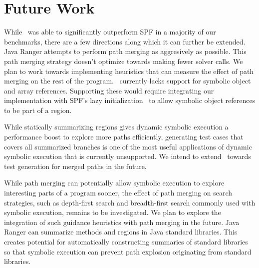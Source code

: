 \section{Future Work}
\label{sec:futureWork}
While \tool\ was able to significantly outperform SPF in a majority of our benchmarks, there are a few directions
along which it can further be extended.
%
Java Ranger attempts to perform path merging as aggresively as possible.
%
This path merging strategy doesn't optimize towards making fewer solver calls.
%
We plan to work towards implementing heuristics that can measure the effect of path merging on the rest of the program.
%
\tool\ currently lacks support for symbolic object and array references.
%
Supporting these would require integrating our implementation with
SPF\rq s lazy initialization~\cite{spf} to allow symbolic object references to be part of a region.

While statically summarizing regions gives dynamic symbolic execution a performance boost to explore more paths
efficiently, generating test cases that covers all summarized branches is one of the most useful applications of dynamic
symbolic execution that is currently unsupported.
%
We intend to extend \tool\ towards test generation for merged paths in the future.

While path merging can potentially allow symbolic execution to explore interesting parts of a program sooner, the
effect of path merging on search strategies, such as depth-first search and breadth-first search commonly used with
symbolic execution, remains to be investigated.
%
We plan to explore the integration of such guidance heuristics with path merging in the future.
%
Java Ranger can summarize methods and regions in Java standard libraries.
%
This creates potential for automatically constructing summaries of standard libraries so that symbolic execution
can prevent path explosion originating from standard libraries.
